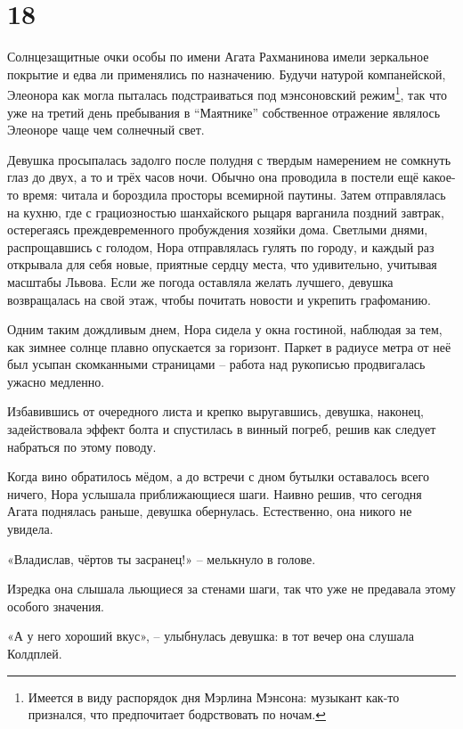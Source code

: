 \documentclass[
  a5paperpaper,
  DIV=11,
  numbers=noendperiod]{scrreprt}
\begin{document}
\section*{18}\label{18}


Солнцезащитные очки особы по имени Агата Рахманинова имели зеркальное
покрытие и едва ли применялись по назначению. Будучи натурой
компанейской, Элеонора как могла пыталась подстраиваться под
мэнсоновский режим\footnote{Имеется в виду распорядок дня Мэрлина
  Мэнсона: музыкант как-то признался, что предпочитает бодрствовать по
  ночам.}, так что уже на третий день пребывания в ``Маятнике''
собственное отражение являлось Элеоноре чаще чем солнечный свет.

Девушка просыпалась задолго после полудня с твердым намерением не
сомкнуть глаз до двух, а то и трёх часов ночи. Обычно она проводила в
постели ещё какое-то время: читала и бороздила просторы всемирной
паутины. Затем отправлялась на кухню, где с грациозностью шанхайского
рыцаря варганила поздний завтрак, остерегаясь преждевременного
пробуждения хозяйки дома. Светлыми днями, распрощавшись с голодом, Нора
отправлялась гулять по городу, и каждый раз открывала для себя новые,
приятные сердцу места, что удивительно, учитывая масштабы Львова. Если
же погода оставляла желать лучшего, девушка возвращалась на свой этаж,
чтобы почитать новости и укрепить графоманию.

Одним таким дождливым днем, Нора сидела у окна гостиной, наблюдая за
тем, как зимнее солнце плавно опускается за горизонт. Паркет в радиусе
метра от неё был усыпан скомканными страницами -- работа над рукописью
продвигалась ужасно медленно.

Избавившись от очередного листа и крепко выругавшись, девушка, наконец,
задействовала эффект болта и спустилась в винный погреб, решив как
следует набраться по этому поводу.

Когда вино обратилось мёдом, а до встречи с дном бутылки оставалось
всего ничего, Нора услышала приближающиеся шаги. Наивно решив, что
сегодня Агата поднялась раньше, девушка обернулась. Естественно, она
никого не увидела.

«Владислав, чёртов ты засранец!» -- мелькнуло в голове.

Изредка она слышала льющиеся за стенами шаги, так что уже не предавала
этому особого значения.

«А у него хороший вкус», -- улыбнулась девушка: в тот вечер она слушала
Колдплей.
\end{document}
